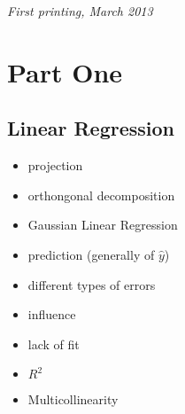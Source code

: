 \documentclass[11pt,fleqn]{book} %
\begin{document}
\noindent \textit{First printing, March 2013} %



\pagestyle{empty} %

\tableofcontents %

\cleardoublepage %

\pagestyle{fancy} %


\part{Part One}



\chapter{Linear Regression}


\begin{itemize}
	\item projection
	\item orthongonal decomposition
	\item Gaussian Linear Regression
	\item prediction (generally of $\hat{y}$)
	\item different types of errors
	\item  influence 
	\item lack of fit
	\item $R^2$
	\item Multicollinearity

\end{itemize}
\end{document}
